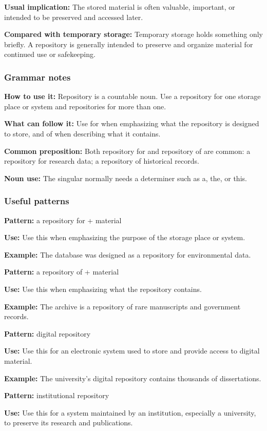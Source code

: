 \documentclass[11pt]{article}
\begin{document}
\textbf{Usual implication:} The stored material is often valuable, important, or intended to be preserved and accessed later.

\textbf{Compared with temporary storage:} Temporary storage holds something only briefly. A repository is generally intended to preserve and organize material for continued use or safekeeping.

\subsubsection{Grammar notes}
\textbf{How to use it:} Repository is a countable noun. Use a repository for one storage place or system and repositories for more than one.

\textbf{What can follow it:} Use for when emphasizing what the repository is designed to store, and of when describing what it contains.

\textbf{Common preposition:} Both repository for and repository of are common: a repository for research data; a repository of historical records.

\textbf{Noun use:} The singular normally needs a determiner such as a, the, or this.

\subsubsection{Useful patterns}
\textbf{Pattern:} a repository for + material

\textbf{Use:} Use this when emphasizing the purpose of the storage place or system.

\textbf{Example:} The database was designed as a repository for environmental data.

\textbf{Pattern:} a repository of + material

\textbf{Use:} Use this when emphasizing what the repository contains.

\textbf{Example:} The archive is a repository of rare manuscripts and government records.

\textbf{Pattern:} digital repository

\textbf{Use:} Use this for an electronic system used to store and provide access to digital material.

\textbf{Example:} The university's digital repository contains thousands of dissertations.

\textbf{Pattern:} institutional repository

\textbf{Use:} Use this for a system maintained by an institution, especially a university, to preserve its research and publications.
\end{document}
